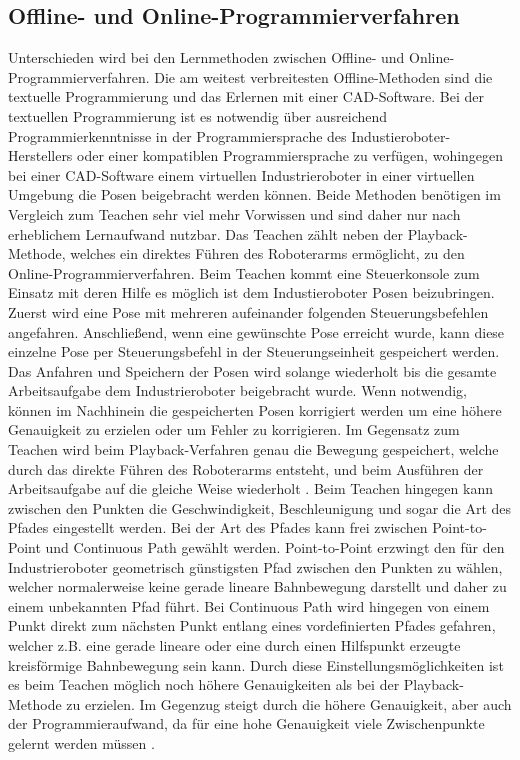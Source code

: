 \subsection{Offline- und Online-Programmierverfahren}
Unterschieden wird bei den Lernmethoden zwischen Offline- und Online-Programmierverfahren. Die am weitest verbreitesten Offline-Methoden sind die textuelle Programmierung und das Erlernen mit einer CAD-Software. Bei der textuellen Programmierung ist es notwendig über ausreichend Programmierkenntnisse in der Programmiersprache des Industieroboter-Herstellers oder einer kompatiblen Programmiersprache zu verfügen, wohingegen bei einer CAD-Software einem virtuellen Industrieroboter in einer virtuellen Umgebung die Posen beigebracht werden können. Beide Methoden benötigen im Vergleich zum Teachen sehr viel mehr Vorwissen und sind daher nur nach erheblichem Lernaufwand nutzbar. Das Teachen zählt neben der Playback-Methode, welches ein direktes Führen des Roboterarms ermöglicht, zu den Online-Programmierverfahren. Beim Teachen kommt eine Steuerkonsole zum Einsatz mit deren Hilfe es möglich ist dem Industieroboter Posen beizubringen. Zuerst wird eine Pose mit mehreren aufeinander folgenden Steuerungsbefehlen angefahren. Anschließend, wenn eine gewünschte Pose erreicht wurde, kann diese einzelne Pose per Steuerungsbefehl in der Steuerungseinheit gespeichert werden. Das Anfahren und Speichern der Posen wird solange wiederholt bis die gesamte Arbeitsaufgabe dem Industrieroboter beigebracht wurde. Wenn notwendig, können im Nachhinein die gespeicherten Posen korrigiert werden um eine höhere Genauigkeit zu erzielen oder um Fehler zu korrigieren. Im Gegensatz zum Teachen wird beim Playback-Verfahren genau die Bewegung gespeichert, welche durch das direkte Führen des Roboterarms entsteht, und beim Ausführen der Arbeitsaufgabe auf die gleiche Weise wiederholt \cite{noauthor_industrieroboter_2020}. Beim Teachen hingegen kann zwischen den Punkten die Geschwindigkeit, Beschleunigung und sogar die Art des Pfades eingestellt werden. Bei der Art des Pfades kann frei zwischen Point-to-Point und Continuous Path gewählt werden. Point-to-Point erzwingt den für den Industrieroboter geometrisch günstigsten Pfad zwischen den Punkten zu wählen, welcher normalerweise keine gerade lineare Bahnbewegung darstellt und daher zu einem unbekannten Pfad führt. Bei Continuous Path wird hingegen von einem Punkt direkt zum nächsten Punkt entlang eines vordefinierten Pfades gefahren, welcher z.B. eine gerade lineare oder eine durch einen Hilfspunkt erzeugte kreisförmige Bahnbewegung sein kann. Durch diese Einstellungsmöglichkeiten ist es beim Teachen möglich noch höhere Genauigkeiten als bei der Playback-Methode zu erzielen. Im Gegenzug steigt durch die höhere Genauigkeit, aber auch der Programmieraufwand, da für eine hohe Genauigkeit viele Zwischenpunkte gelernt werden müssen \cite{noauthor_teach-technik_2020}.\\

